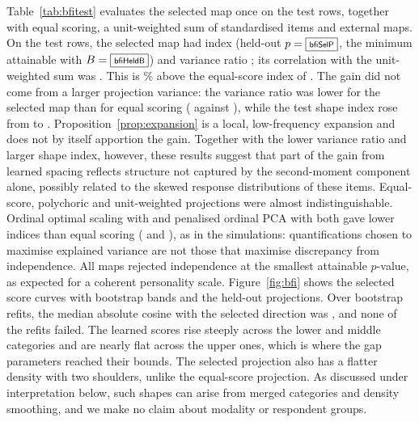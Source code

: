 Table~\ref{tab:bfitest} evaluates the selected map once on the test rows, together with equal scoring, a unit-weighted sum of standardised items and external maps. On the test rows, the selected map had index \bfiSelTest{} (held-out $p=\fbox{\scriptsize\textsf{bfiSelP}}$, the minimum attainable with $B=\fbox{\scriptsize\textsf{bfiHeldB}}$) and variance ratio \bfiSelVarRatio{}; its correlation with the unit-weighted sum was \bfiCorKeyed{}. This is \bfiGainPct\% above the equal-score index of \bfiLinTest{}. The gain did not come from a larger projection variance: the variance ratio was lower for the selected map than for equal scoring (\bfiSelVarRatio{} against \bfiLinVarRatio{}), while the test shape index rose from \bfiLinShape{} to \bfiSelShape{}. Proposition~\ref{prop:expansion} is a local, low-frequency expansion and does not by itself apportion the gain. Together with the lower variance ratio and larger shape index, however, these results suggest that part of the gain from learned spacing reflects structure not captured by the second-moment component alone, possibly related to the skewed response distributions of these items. Equal-score, polychoric and unit-weighted projections were almost indistinguishable. Ordinal optimal scaling with  and penalised ordinal PCA with  both gave lower indices than equal scoring (\bfiGifiTest{} and \bfiOrdpensTest{}), as in the simulations: quantifications chosen to maximise explained variance are not those that maximise discrepancy from independence. All maps rejected independence at the smallest attainable $p$-value, as expected for a coherent personality scale. Figure~\ref{fig:bfi} shows the selected score curves with bootstrap bands and the held-out projections. Over \bfiStabB{} bootstrap refits, the median absolute cosine with the selected direction was \bfiStabCong{}, and none of the \bfiStabB{} refits failed. The learned scores rise steeply across the lower and middle categories and are nearly flat across the upper ones, which is where the gap parameters reached their bounds. The selected projection also has a flatter density with two shoulders, unlike the equal-score projection. As discussed under interpretation below, such shapes can arise from merged categories and density smoothing, and we make no claim about modality or respondent groups.

\begin{table}[htbp]
\centering\small
{}
\caption{Final test-set evaluation of frozen maps for the neuroticism items. The second row is the smoother $\gamma=0.01$ setting, reported as a sensitivity analysis rather than as a second selection. ``Held-out $p$ of 0.001 is the minimum attainable with $B=999$. The last column is the correlation of each projection with the unit-weighted sum of standardised items.}
\label{tab:bfitest}
\end{table}

